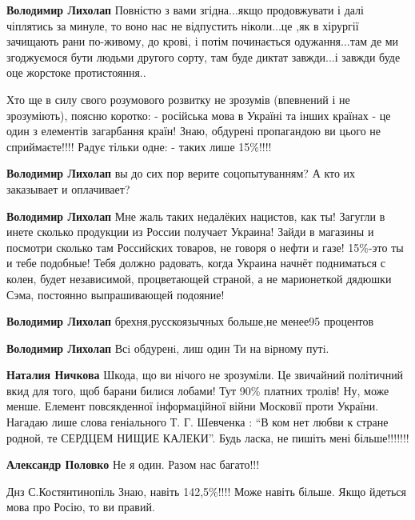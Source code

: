 \begin{itemize}
{\begin{itemize}
\textbf{Володимир Лихолап} Повністю з вами згідна...якщо продовжувати і далі
чіплятись за минуле, то воно нас не відпустить ніколи...це ,як в
хірургії зачищають рани по-живому, до крові, і потім починається
одужання...там де ми згоджуємося бути людьми другого сорту, там буде диктат
завжди...і завжди буде оце жорстоке протистояння..
\end{itemize}


Хто ще в силу свого розумового розвитку не зрозумів (впевнений і не
зрозуміють), поясню коротко: - російська мова в Україні та інших країнах - це
один з елементів загарбання країн! Знаю, обдурені пропагандою ви цього не
сприймаєте!!!! Радує тільки одне: - таких лише 15\%!!!!

\begin{itemize}

\textbf{Володимир Лихолап} вы до сих пор верите соцопытуванням? А кто их заказывает и оплачивает?


\textbf{Володимир Лихолап} Мне жаль таких недалёких нацистов, как ты! Загугли в
инете сколько продукции из России получает Украина! Зайди в магазины и посмотри
сколько там Российских товаров, не говоря о нефти и газе! 15\%-это ты и тебе
подобные! Тебя должно радовать, когда Украина начнёт подниматься с колен, будет
независимой, процветающей страной, а не марионеткой дядюшки Сэма, постоянно
выпрашивающей подояние!

\textbf{Володимир Лихолап} брехня,русскоязычных больше,не менее95 процентов

\textbf{Володимир Лихолап} Всi обдуренi, лиш один Ти на вiрному путi.

\textbf{Наталия Ничкова} Шкода, що ви нічого не зрозуміли. Це звичайний політичний вкид
для того, щоб барани билися лобами! Тут 90\% платних тролів! Ну, може менше.
Елемент повсякденної інформаційної війни Московії проти України. Нагадаю лише
слова геніального Т. Г. Шевченка : \enquote{В ком нет любви к стране родной, те СЕРДЦЕМ
НИЩИЕ КАЛЕКИ}. Будь ласка, не пишіть мені більше!!!!!!!

\textbf{Александр Половко} Не я один. Разом нас багато!!!


Днз С.Костянтинопіль Знаю, навіть 142,5\%!!!! Може навіть більше. Якщо йдеться мова про Росію, то ви правий.


\end{itemize}}
\end{itemize}
